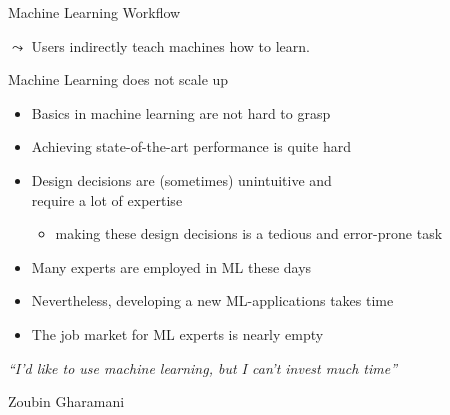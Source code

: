 \begin{frame}[c]{Machine Learning Workflow}

\centering


\pause
 
\bigskip
\bigskip
$\leadsto$ Users indirectly teach machines how to learn.

\end{frame}
\begin{frame}[c]{Machine Learning does not scale up}

\begin{itemize}
  \item Basics in machine learning are not hard to grasp
  \smallskip
  \item Achieving state-of-the-art performance is quite hard
  \smallskip
  \item Design decisions are (sometimes) unintuitive and\\ require a lot of expertise
  \begin{itemize}
    \item making these design decisions is a tedious and error-prone task
  \end{itemize}
  \smallskip
  \item Many experts are employed in ML these days
  \smallskip
  \item Nevertheless, developing a new ML-applications takes time
  \smallskip
  \item The job market for ML experts is nearly empty
\end{itemize}

\bigskip

\textit{``I'd like to use machine learning, but I can't invest much time''}

\hfill Zoubin Gharamani


\end{frame}
